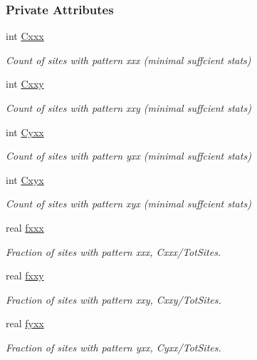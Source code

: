 \subsubsection*{\-Private \-Attributes}
\begin{DoxyCompactItemize}
\item 
int \hyperlink{classFCFN3Rooted_aa8d0899c02617f891b449bf4fea77124}{\-Cxxx}
\begin{DoxyCompactList}\small\item\em \-Count of sites with pattern xxx (minimal suffcient stats) \end{DoxyCompactList}\item 
int \hyperlink{classFCFN3Rooted_a0e5c7aed5b6d0a32f31f6256d667bb94}{\-Cxxy}
\begin{DoxyCompactList}\small\item\em \-Count of sites with pattern xxy (minimal suffcient stats) \end{DoxyCompactList}\item 
int \hyperlink{classFCFN3Rooted_aafa3f819584022c0bdae373df692dbef}{\-Cyxx}
\begin{DoxyCompactList}\small\item\em \-Count of sites with pattern yxx (minimal suffcient stats) \end{DoxyCompactList}\item 
int \hyperlink{classFCFN3Rooted_afa52426ba2915fa90e85fd870a99936b}{\-Cxyx}
\begin{DoxyCompactList}\small\item\em \-Count of sites with pattern xyx (minimal suffcient stats) \end{DoxyCompactList}\item 
real \hyperlink{classFCFN3Rooted_a99fc875bb556dc2f20eee8cfdcb55e41}{fxxx}
\begin{DoxyCompactList}\small\item\em \-Fraction of sites with pattern xxx, \-Cxxx/\-Tot\-Sites. \end{DoxyCompactList}\item 
real \hyperlink{classFCFN3Rooted_a432d5b5019c490dbb321f9756d3ac37f}{fxxy}
\begin{DoxyCompactList}\small\item\em \-Fraction of sites with pattern xxy, \-Cxxy/\-Tot\-Sites. \end{DoxyCompactList}\item 
real \hyperlink{classFCFN3Rooted_af92c9b535582cab0402f4ab5c16d96a7}{fyxx}
\begin{DoxyCompactList}\small\item\em \-Fraction of sites with pattern yxx, \-Cyxx/\-Tot\-Sites. \end{DoxyCompactList}\item 

\end{DoxyCompactItemize}
